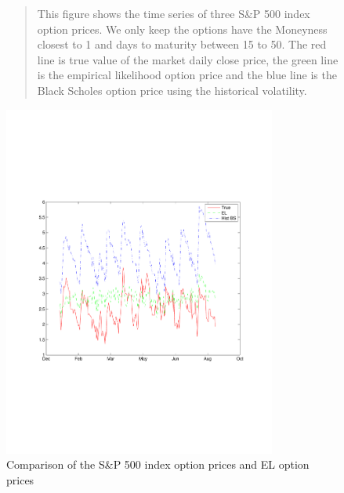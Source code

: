 \newpage

\begin{figure}[t]
\centering \caption{Comparison of the S\&P 500 index option prices and EL option prices}

\begin{quote} %

This figure shows the time series of three S\&P 500 index option prices. We only keep the options have the Moneyness closest to 1 and days to maturity between 15 to 50. The red line is true value of the market daily close price, the green line is the empirical likelihood option price and the blue line is the Black Scholes option price using the historical volatility. 
\end{quote}
  \includegraphics[width=0.8\textwidth]{SP500.pdf}
\end{figure}

